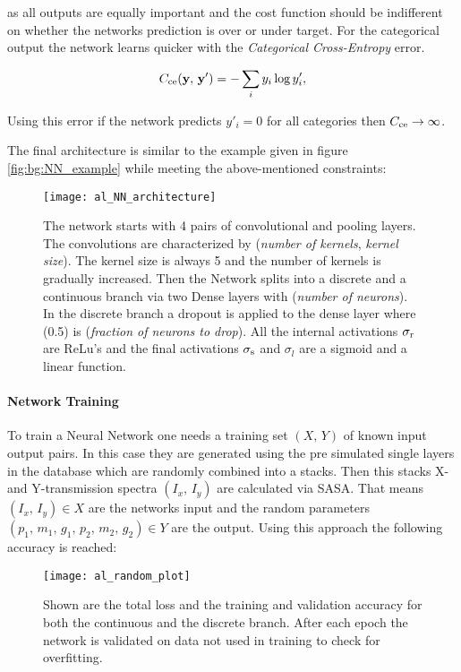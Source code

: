 \noindent
as all outputs are equally important and the cost function should be indifferent on whether the networks prediction is over or under target. For the categorical output the network learns quicker with the \textit{Categorical Cross-Entropy} error.

\begin{equation}
    C_{\mathrm{ce}}(\vb y, \, \vb y') = - \sum_i y_i \log y'_i,
\end{equation}

\noindent
Using this error if the network predicts $y'_i = 0$ for all categories then $C_{\mathrm{ce}} \rightarrow \infty$. 

The final architecture is similar to the example given in figure \ref{fig:bg:NN_example} while meeting the above-mentioned constraints:

\begin{figure}[H]
    \centering
    \texttt{[image: al\_NN\_architecture]}
    \caption{The network starts with 4 pairs of convolutional and pooling layers. The convolutions are characterized by (\textit{number of kernels}, \textit{kernel size}). The kernel size is always 5 and the number of kernels is gradually increased. Then the Network splits into a discrete and a continuous branch via two Dense layers with (\textit{number of neurons}). In the discrete branch a dropout is applied to the dense layer where (0.5) is (\textit{fraction of neurons to drop}).
    All the internal activations $\sigma_{\mathrm{r}}$ are ReLu's and the final activations $\sigma_{\mathrm{s}}$ and $\sigma_{l}$ are a sigmoid and a linear function.}
    \label{fig:al:NN_architecture}
\end{figure}

\newpage
\paragraph{Network Training}
To train a Neural Network one needs a training set $(X, \, Y)$ of known input output pairs. In this case they are generated using the pre simulated single layers in the database which are randomly combined into a stacks. Then this stacks X- and Y-transmission spectra $(I_x, \, I_y)$ are calculated via SASA.
That means $(I_x, \, I_y) \in X$ are the networks input and the random parameters $(p_1, \, m_1, \, g_1, \, p_2, \, m_2, \, g_2) \in Y$ are the output.
Using this approach the following accuracy is reached:

\begin{figure}[H]
    \centering
    \texttt{[image: al\_random\_plot]}
    \caption{Shown are the total loss and the training and validation accuracy for both the continuous and the discrete branch. After each epoch the network is validated on data not used in training to check for overfitting.}
    \label{}
\end{figure}

